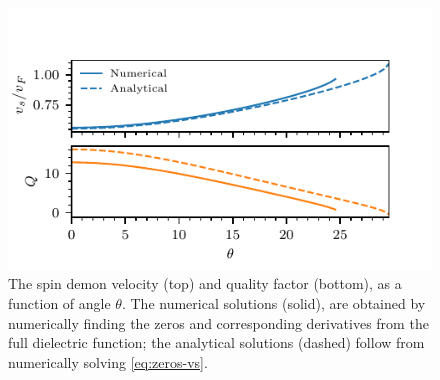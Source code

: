 \documentclass[aps,prl,reprint,twocolumns,superscriptaddress]{revtex4-2}
\begin{document}
	\begin{figure}
		\includegraphics{angles_vs_and_Q}
		\caption{The spin demon velocity (top) and quality factor (bottom), as a function of angle $\theta$. The numerical solutions (solid),  are obtained by numerically finding the zeros and corresponding derivatives from the full dielectric function; the analytical solutions (dashed) follow from numerically solving \cref{eq:zeros-vs}. 
			\label{fig:vs-and-Q} }
	\end{figure}
	
\end{document}
